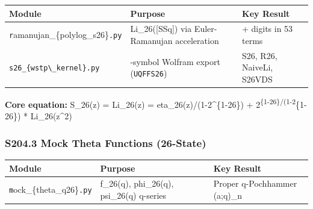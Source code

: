 {\def\LTcaptype{none} %
\begin{longtable}[]{@{}
  >{\raggedright\arraybackslash}p{}
  >{\raggedright\arraybackslash}p{}
  >{\raggedright\arraybackslash}p{}@{}}
\toprule\noalign{}
\begin{minipage}[b]{\linewidth}\raggedright
Module
\end{minipage} & \begin{minipage}[b]{\linewidth}\raggedright
Purpose
\end{minipage} & \begin{minipage}[b]{\linewidth}\raggedright
Key Result
\end{minipage} \\
\midrule\noalign{}
\endhead
\bottomrule\noalign{}
\endlastfoot
\texttt{r}amanujan\_\{polylog\_s26\}\texttt{.py} & Li\_26({[}SSq{]}) via
Euler-Ramanujan acceleration & 15.7+ digits in 53 terms \\
\texttt{s26\_\{wstp\textbackslash{}\_kernel\}.py} & 8-symbol Wolfram
export (\texttt{UQFFS26}) & S26, R26, NaiveLi, S26VDS \\
\end{longtable}
}

\textbf{Core equation:} S\_26(z) = Li\_26(z) =
eta\_26(z)/(1-2\^{}\{1-26\}) + 2\textsuperscript{\{1-26\}/(1-2}\{1-26\})
* Li\_26(z\^{}2)

\subsubsection{S204.3 Mock Theta Functions
(26-State)}\label{s204.3-mock-theta-functions-26-state}

{\def\LTcaptype{none} %
\begin{longtable}[]{@{}
  >{\raggedright\arraybackslash}p{}
  >{\raggedright\arraybackslash}p{}
  >{\raggedright\arraybackslash}p{}@{}}
\toprule\noalign{}
\begin{minipage}[b]{\linewidth}\raggedright
Module
\end{minipage} & \begin{minipage}[b]{\linewidth}\raggedright
Purpose
\end{minipage} & \begin{minipage}[b]{\linewidth}\raggedright
Key Result
\end{minipage} \\
\midrule\noalign{}
\endhead
\bottomrule\noalign{}
\endlastfoot
\texttt{m}ock\_\{theta\_q26\}\texttt{.py} & f\_26(q), phi\_26(q),
psi\_26(q) q-series & Proper q-Pochhammer (a;q)\_n \\
\end{longtable}
}

